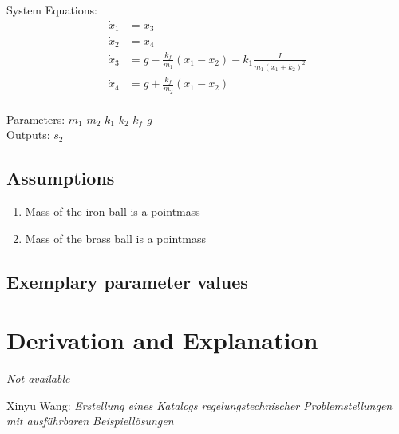 \documentclass[10pt,a4paper]{article}
\begin{document}
	\noindent System Equations:			
	\begin{subequations}
	\begin{align}
		\dot{x}_1 &= x_3 \\
		\dot{x}_2 &= x_4 \\
		\dot{x}_3 &= g - \frac{k_f}{m_1}(x_1 - x_2) - k_1\frac{I}{m_1(x_1+k_2)^2}  \\
		\dot{x}_4 &= g + \frac{k_f}{m_2}(x_1 - x_2) \\
	\end{align}
	\end{subequations}

	\noindent
	Parameters: $m_1$ $m_2$ $k_1$ $k_2$ $k_f$ $g$  %
	\\
	Outputs: $s_2$ %
	
	
	\subsection{Assumptions} %
		\begin{enumerate} %
			\item Mass of the iron ball is a pointmass
			\item Mass of the brass ball is a pointmass
		\end{enumerate}
	
	
	\subsection{Exemplary parameter values}
	

	
	\section{Derivation and Explanation} %
	
	\textit{Not available}
	
	
	\begin{thebibliography}{10}		
		Xinyu Wang: 
		\textit{Erstellung eines Katalogs regelungstechnischer Problemstellungen mit ausführbaren Beispiellösungen}
	\end{thebibliography}
\end{document}
